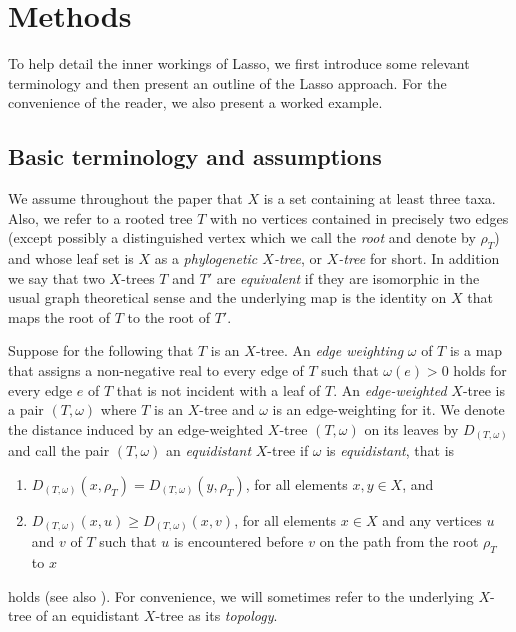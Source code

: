 \section{Methods}
\label{sec:methods}

To help detail the inner workings of {\sc Lasso}, we first introduce some
relevant terminology and then present an outline of the {\sc Lasso}
approach. For the convenience of the reader, we also present a worked example.

\subsection{Basic terminology and assumptions}
\label{sec:terminology}

We assume throughout the paper that $X$ is a set containing at least three
taxa. Also, we refer to a rooted tree $T$ with no vertices contained in
precisely two edges (except possibly a distinguished vertex which we call the
{\em root} and denote by $\rho_T$) and whose leaf set is $X$ as a {\em
  phylogenetic $X$-tree}, or {\em $X$-tree} for short.  In addition we say
that two $X$-trees $T$ and $T'$ are {\em equivalent} if they are isomorphic in
the usual graph theoretical sense and the underlying map is the identity on
$X$ that maps the root of $T$ to the root of $T'$.

Suppose for the following that $T$ is an $X$-tree.  An {\em edge weighting}
$\omega$ of $T$ is a map that assigns a non-negative real to every edge of $T$
such that $\omega(e)>0$ holds for every edge $e$ of $T$ that is not incident
with a leaf of $T$.  An {\em edge-weighted} $X$-tree is a pair $(T,\omega)$
where $T$ is an $X$-tree and $\omega$ is an edge-weighting for it.  We denote
the distance induced by an edge-weighted $X$-tree $(T,\omega)$ on its leaves
by $D_{(T,\omega)}$ and call the pair $(T,\omega)$ an {\em equidistant}
$X$-tree if ${\omega}$ is {\em equidistant}, that is
\begin{enumerate}
\item $D_{(T,\omega)}(x,\rho_T)=  D_{(T,\omega)}(y,\rho_T)$, for all elements
$x,y\in X$, and
\item $D_{(T,\omega)}(x,u)\geq D_{(T,\omega)}(x,v)$, for all elements $x\in X$
  and any vertices $u$ and $v$ of $T$ such that $u$ is encountered before $v$
  on the path from the root $\rho_T$ to $x$
\end{enumerate} 
holds (see also \cite{semple2003phylogenetics}). For convenience, we will sometimes refer to the
underlying $X$-tree of an equidistant $X$-tree as its {\em topology}.

